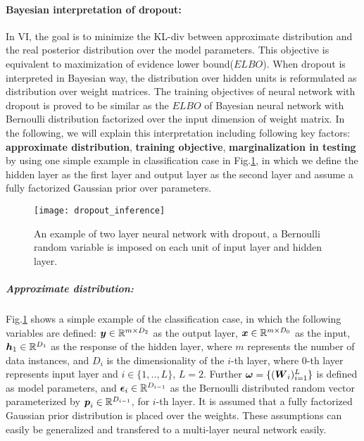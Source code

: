 \paragraph{Bayesian interpretation of dropout:}
In VI, the goal is to minimize the KL-div between approximate distribution and the real posterior distribution over the model parameters. This objective is equivalent to maximization of evidence lower bound($ELBO$). When dropout is interpreted in Bayesian way, the distribution over hidden units is reformulated as distribution over weight matrices. The training objectives of neural network with dropout is proved to be similar as the $ELBO$ of Bayesian neural network with Bernoulli distribution factorized over the input dimension of weight matrix. In the following, we will explain this interpretation including following key factors: \textbf{approximate distribution}, \textbf{training objective}, \textbf{marginalization in testing} by using one simple example in {classification} case in Fig.\ref{fig:dropout_inference}, in which we define the hidden layer as the first layer and output layer as the second layer and assume a fully factorized Gaussian prior over parameters.


\begin{figure}[h!]
	\centering
	\texttt{[image: dropout\_inference]}
	\caption{An example of two layer neural network with dropout, a Bernoulli random variable is imposed on each unit of input layer and hidden layer.}	
	\label{fig:dropout_inference}
\end{figure}


\subparagraph{Approximate distribution:}
Fig.\ref{fig:dropout_inference} shows a simple example of the {classification} case, in which the following variables are defined: %
 $\boldsymbol y\in \mathbb R ^{m \times D_{2}}$ as the output layer, $\boldsymbol x \in \mathbb R^{m \times D_{0}}$ as the input, $\boldsymbol h_{1} \in \mathbb R^{D_{1}}$ as the response of the hidden layer, where $m$ represents the number of data instances, and $D_{i}$ is the dimensionality of the $i$-th layer, where $0$-th layer represents input layer and $i \in \{1,..,L\}$, $L=2$. Further $\boldsymbol \omega = \{ (\boldsymbol W_{i})_{i=1}^{L}  \}$ is defined as model parameters, and $\boldsymbol \epsilon_{i} \in \mathbb R^{D_{i-1}}$ as the Bernoulli distributed random vector parameterized by $\boldsymbol p_{i} \in \mathbb R^{D_{i-1}}$, for $i$-th layer. 
It is assumed that a fully factorized Gaussian prior distribution is placed over the weights. These assumptions can easily be generalized and transfered to a multi-layer neural network easily. 

